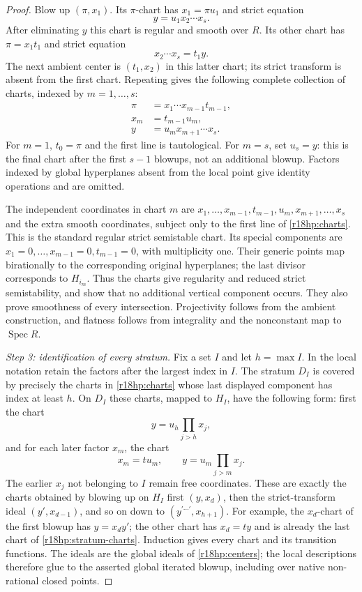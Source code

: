 \begin{proof}
Blow up $(\pi,x_1)$.  Its $\pi$-chart has
$x_1=\pi u_1$ and strict equation
\[
                         y=u_1x_2\cdots x_s.
\]
After eliminating $y$ this chart is regular and smooth over $R$.
Its other chart has $\pi=x_1t_1$ and strict equation
\[
                          x_2\cdots x_s=t_1y.
\]
The next ambient center is $(t_1,x_2)$ in this latter chart;
its strict transform is absent from the first chart.
Repeating gives the following complete collection of charts,
indexed by $m=1,\ldots,s$:
\[
 \begin{split}
  \pi&=x_1\cdots x_{m-1}t_{m-1},\\
  x_m&=t_{m-1}u_m,\\
  y&=u_mx_{m+1}\cdots x_s.
 \end{split}
 \tag{HP18.8}\label{r18hp:charts}
\]
For $m=1$, $t_0=\pi$ and the first line is tautological.
For $m=s$, set $u_s=y$: this is the final chart after the
first $s-1$ blowups, not an additional blowup.  Factors indexed
by global hyperplanes absent from the local point give identity
operations and are omitted.

The independent coordinates in chart $m$ are
$x_1,\ldots,x_{m-1},t_{m-1},u_m,x_{m+1},\ldots,x_s$
and the extra smooth coordinates, subject only to the first
line of \eqref{r18hp:charts}.  This is the standard regular
strict semistable chart.  Its special components are
$x_1=0,\ldots,x_{m-1}=0,t_{m-1}=0$, with multiplicity one.
Their generic points map birationally to the corresponding
original hyperplanes; the last divisor corresponds to $H_{i_m}$.
Thus the charts give regularity and reduced strict semistability,
and show that no additional vertical component occurs.
They also prove smoothness of every intersection.
Projectivity follows from the ambient construction, and
flatness follows from integrality and the nonconstant map to
$\operatorname{Spec}R$.

\emph{Step 3: identification of every stratum.}
Fix a set $I$ and let $h=\max I$.  In the local notation retain
the factors after the largest index in $I$.  The stratum $D_I$
is covered by precisely the charts in
\eqref{r18hp:charts} whose last displayed component has index
at least $h$.  On $D_I$ these charts, mapped to $H_I$, have the
following form: first the chart
\[
             y=u_h\prod_{j>h}x_j,
\]
and for each later factor $x_m$, the chart
\[
             x_m=t u_m,\qquad y=u_m\prod_{j>m}x_j.
 \tag{HP18.9}\label{r18hp:stratum-charts}
\]
The earlier $x_j$ not belonging to $I$ remain free coordinates.
These are exactly the charts obtained by blowing up on $H_I$
first $(y,x_d)$, then the strict-transform ideal $(y',x_{d-1})$,
and so on down to $(y^{\prime\cdots\prime},x_{h+1})$.
For example, the $x_d$-chart of the first blowup has $y=x_dy'$;
the other chart has $x_d=ty$ and is already the last chart of
\eqref{r18hp:stratum-charts}.  Induction gives every chart and
its transition functions.  The ideals are the global ideals of
\eqref{r18hp:centers}; the local descriptions therefore glue to
the asserted global iterated blowup, including over native
non-rational closed points.


\end{proof}
